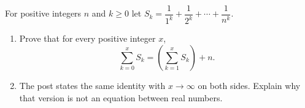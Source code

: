 For positive integers $n$ and $k\ge0$ let $S_k=\dfrac{1}{1^k}+\dfrac{1}{2^k}+\cdots+\dfrac{1}{n^k}$.
\begin{enumerate}
\item[(a)] Prove that for every positive integer $x$,
\[
\sum_{k=0}^{x}S_k=\left(\sum_{k=1}^{x}S_k\right)+n .
\]
\item[(b)] The post states the same identity with $x\to\infty$ on both sides. Explain why that version is not an equation between real numbers.
\end{enumerate}
